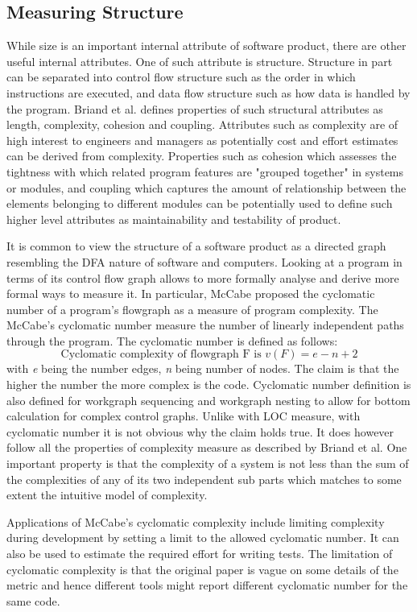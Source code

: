 \documentclass[11pt]{article}
\begin{document}
\subsection{Measuring Structure}
While size is an important internal attribute of software product, there are other useful internal attributes. One of such attribute is structure. Structure in part can be separated into control flow structure such as the order in which instructions are executed, and data flow structure such as how data is handled by the program.\cite{Fenton:2014:SMR:2700539} Briand et al.\cite{Briand:1996} defines properties of such structural attributes as length, complexity, cohesion and coupling. Attributes such as complexity are of high interest to engineers and managers as potentially cost and effort estimates can be derived from complexity. Properties such as cohesion which assesses the tightness with which related program features are "grouped together" in systems or modules\cite{Briand:1996}, and coupling which captures the amount of relationship between the elements belonging to different modules\cite{Briand:1996} can be potentially used to define such higher level attributes as maintainability and testability of product.
\par 
It is common to view the structure of a software product as a directed graph resembling the DFA nature of software and computers. Looking at a program in terms of its control flow graph allows to more formally analyse and derive more formal ways to measure it. In particular, McCabe proposed the cyclomatic number of a program's flowgraph as a measure of program complexity. The McCabe's cyclomatic number measure the number of linearly independent paths through the program. The cyclomatic number is defined as follows:\[ \text{Cyclomatic complexity of flowgraph F is }v(F)=e-n+2\] with \textit{e} being the number edges, \textit{n} being number of nodes. The claim is that the higher the number the more complex is the code.  Cyclomatic number definition is also defined for workgraph sequencing and workgraph nesting to allow for bottom calculation for complex control graphs. Unlike with LOC measure, with cyclomatic number it is not obvious why the claim holds true. It does however follow all the properties of complexity measure as described by Briand et al.\cite{Briand:1996} One important property is that the complexity of a system is not less than the sum of the complexities of any of its two independent sub parts which matches to some extent the intuitive model of complexity.
\par 
Applications of McCabe's cyclomatic complexity include limiting complexity during development by setting a limit to the allowed cyclomatic number. It can also be used to estimate the required effort for writing tests.
The limitation of cyclomatic complexity is that the original paper is vague on some details of the metric and hence different tools might report different cyclomatic number for the same code. 
\end{document}

